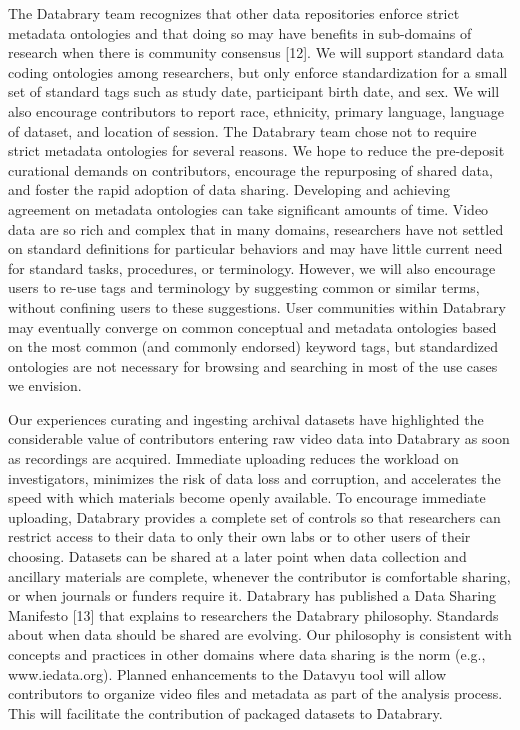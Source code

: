 \documentclass{sig-alternate}
\begin{document}
The Databrary team recognizes that other data repositories enforce
strict metadata ontologies and that doing so may have benefits in
sub-domains of research when there is community consensus [12]. We will
support standard data coding ontologies among researchers, but only
enforce standardization for a small set of standard tags such as study
date, participant birth date, and sex. We will also encourage
contributors to report race, ethnicity, primary language, language of
dataset, and location of session. The Databrary team chose not to
require strict metadata ontologies for several reasons. We hope to
reduce the pre-deposit curational demands on contributors, encourage the
repurposing of shared data, and foster the rapid adoption of data
sharing. Developing and achieving agreement on metadata ontologies can
take significant amounts of time. Video data are so rich and complex
that in many domains, researchers have not settled on standard
definitions for particular behaviors and may have little current need
for standard tasks, procedures, or terminology. However, we will also
encourage users to re-use tags and terminology by suggesting common or
similar terms, without confining users to these suggestions. User
communities within Databrary may eventually converge on common
conceptual and metadata ontologies based on the most common (and
commonly endorsed) keyword tags, but standardized ontologies are not
necessary for browsing and searching in most of the use cases we
envision.

Our experiences curating and ingesting archival datasets have
highlighted the considerable value of contributors entering raw video
data into Databrary as soon as recordings are acquired. Immediate
uploading reduces the workload on investigators, minimizes the risk of
data loss and corruption, and accelerates the speed with which materials
become openly available. To encourage immediate uploading, Databrary
provides a complete set of controls so that researchers can restrict
access to their data to only their own labs or to other users of their
choosing. Datasets can be shared at a later point when data collection
and ancillary materials are complete, whenever the contributor is
comfortable sharing, or when journals or funders require it. Databrary
has published a Data Sharing Manifesto [13] that explains to researchers
the Databrary philosophy. Standards about when data should be shared are
evolving. Our philosophy is consistent with concepts and practices in
other domains where data sharing is the norm (e.g., www.iedata.org).
Planned enhancements to the Datavyu tool will allow contributors to
organize video files and metadata as part of the analysis process. This
will facilitate the contribution of packaged datasets to Databrary.
\end{document}
